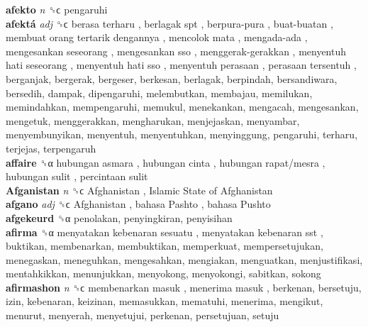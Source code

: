 \textbf{afekto} \emph{n}  ␝ϲ  pengaruhi  \\
\textbf{afektá} \emph{adj}  ␝ϲ   berasa terharu ,  berlagak spt ,  berpura-pura ,  buat-buatan ,  membuat orang tertarik dengannya ,  mencolok mata ,  mengada-ada ,  mengesankan seseorang ,  mengesankan sso ,  menggerak-gerakkan ,  menyentuh hati seseorang ,  menyentuh hati sso ,  menyentuh perasaan ,  perasaan tersentuh , berganjak, bergerak, bergeser, berkesan, berlagak, berpindah, bersandiwara, bersedih, dampak, dipengaruhi, melembutkan, membajau, memilukan, memindahkan, mempengaruhi, memukul, menekankan, mengacah, mengesankan, mengetuk, menggerakkan, mengharukan, menjejaskan, menyambar, menyembunyikan, menyentuh, menyentuhkan, menyinggung, pengaruhi, terharu, terjejas, terpengaruh  \\
\textbf{affaire} ␝α   hubungan asmara ,  hubungan cinta ,  hubungan rapat/mesra ,  hubungan sulit ,  percintaan sulit   \\
\textbf{Afganistan} \emph{n}  ␝ϲ   Afghanistan ,  Islamic State of Afghanistan   \\
\textbf{afgano} \emph{adj}  ␝ϲ   Afghanistan ,  bahasa Pashto ,  bahasa Pushto   \\
\textbf{afgekeurd} ␝α  penolakan, penyingkiran, penyisihan  \\
\textbf{afirma} ␝α   menyatakan kebenaran sesuatu ,  menyatakan kebenaran sst , buktikan, membenarkan, membuktikan, memperkuat, mempersetujukan, menegaskan, meneguhkan, mengesahkan, mengiakan, menguatkan, menjustifikasi, mentahkikkan, menunjukkan, menyokong, menyokongi, sabitkan, sokong  \\
\textbf{afirmashon} \emph{n}  ␝ϲ   membenarkan masuk ,  menerima masuk , berkenan, bersetuju, izin, kebenaran, keizinan, memasukkan, mematuhi, menerima, mengikut, menurut, menyerah, menyetujui, perkenan, persetujuan, setuju  \\
